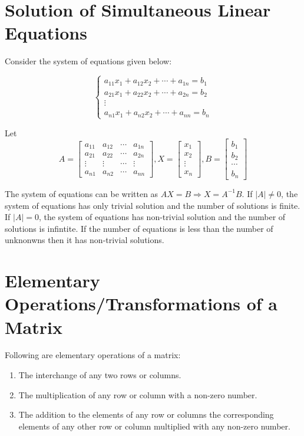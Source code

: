 \section{Solution of Simultaneous Linear Equations}
Consider the system of equations given below:

$$\begin{cases}a_{11}x_1 + a_{12}x_2 + \cdots + a_{1n} = b_1\\a_{21}x_1 +
a_{22}x_2 + \cdots + a_{2n} = b_2\\\vdots\\a_{n1}x_1 + a_{n2}x_2 + \cdots +
a_{nn} = b_n\end{cases}$$

Let $$A = \begin{bmatrix}a_{11} & a_{12} & \cdots &a_{1n}\\a_{21} & a_{22}
& \cdots &a_{2n}\\\vdots & \vdots & \cdots & \vdots\\a_{n1} & a_{n2} & \cdots
&a_{nn}\end{bmatrix}, X= \begin{bmatrix}x_1\\x_2\\\vdots\\x_n\end{bmatrix}, B =
\begin{bmatrix}b_1 \\ b_2 \\ \cdots\\ b_n\end{bmatrix}$$

The system of equations can be written as $AX = B\Rightarrow X=A^{-1}B$. If $|A|\neq 0$, the system of equations has only trivial
solution and the number of solutions is finite. If $|A|=0$, the system of equations has non-trivial solution and the number of
solutions is infintite. If the number of equations is less than the number of unknonwns then it has non-trivial solutions.

\section{Elementary Operations/Transformations of a Matrix}
Following are elementary operations of a matrix:
\begin{enumerate}
\item The interchange of any two rows or columns.
\item The multiplication of any row or column with a non-zero number.
\item The addition to the elements of any row or columns the corresponding elements of any other row or column multiplied with any
  non-zero number.
\end{enumerate}

